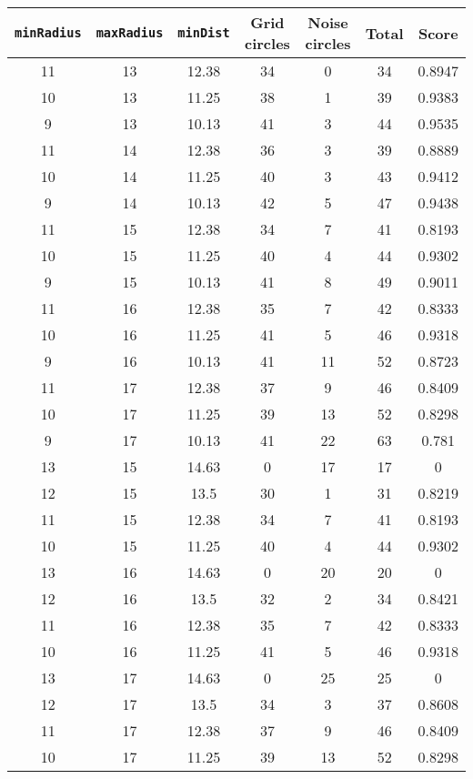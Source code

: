 \documentclass[letterpaper, 12pt]{article}
\begin{document}
\begin{longtable}{|c|c|c|c|c|c|c|}
\hline
\textbf{\texttt{minRadius}} & \textbf{\texttt{maxRadius}} & \textbf{\texttt{minDist}} & \textbf{Grid circles} & \textbf{Noise circles} & \textbf{Total} & \textbf{Score} \\
\hline
11 & 13 & 12.38 & 34 & 0 & 34 & 0.8947 \\
\hline
10 & 13 & 11.25 & 38 & 1 & 39 & 0.9383 \\
\hline
9 & 13 & 10.13 & 41 & 3 & 44 & 0.9535 \\
\hline
11 & 14 & 12.38 & 36 & 3 & 39 & 0.8889 \\
\hline
10 & 14 & 11.25 & 40 & 3 & 43 & 0.9412 \\
\hline
9 & 14 & 10.13 & 42 & 5 & 47 & 0.9438 \\
\hline
11 & 15 & 12.38 & 34 & 7 & 41 & 0.8193 \\
\hline
10 & 15 & 11.25 & 40 & 4 & 44 & 0.9302 \\
\hline
9 & 15 & 10.13 & 41 & 8 & 49 & 0.9011 \\
\hline
11 & 16 & 12.38 & 35 & 7 & 42 & 0.8333 \\
\hline
10 & 16 & 11.25 & 41 & 5 & 46 & 0.9318 \\
\hline
9 & 16 & 10.13 & 41 & 11 & 52 & 0.8723 \\
\hline
11 & 17 & 12.38 & 37 & 9 & 46 & 0.8409 \\
\hline
10 & 17 & 11.25 & 39 & 13 & 52 & 0.8298 \\
\hline
9 & 17 & 10.13 & 41 & 22 & 63 & 0.781 \\
\hline
13 & 15 & 14.63 & 0 & 17 & 17 & 0 \\
\hline
12 & 15 & 13.5 & 30 & 1 & 31 & 0.8219 \\
\hline
11 & 15 & 12.38 & 34 & 7 & 41 & 0.8193 \\
\hline
10 & 15 & 11.25 & 40 & 4 & 44 & 0.9302 \\
\hline
13 & 16 & 14.63 & 0 & 20 & 20 & 0 \\
\hline
12 & 16 & 13.5 & 32 & 2 & 34 & 0.8421 \\
\hline
11 & 16 & 12.38 & 35 & 7 & 42 & 0.8333 \\
\hline
10 & 16 & 11.25 & 41 & 5 & 46 & 0.9318 \\
\hline
13 & 17 & 14.63 & 0 & 25 & 25 & 0 \\
\hline
12 & 17 & 13.5 & 34 & 3 & 37 & 0.8608 \\
\hline
11 & 17 & 12.38 & 37 & 9 & 46 & 0.8409 \\
\hline
10 & 17 & 11.25 & 39 & 13 & 52 & 0.8298 \\

\end{longtable}
\end{document}
